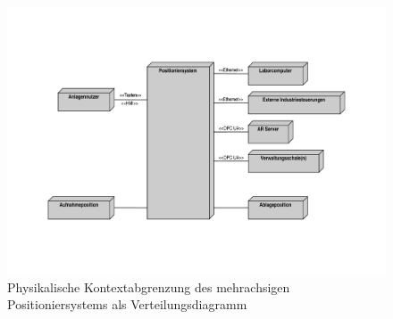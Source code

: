 \documentclass[../../../Bachelorarbeit.tex]{subfiles}
\begin{document}
\begin{figure}[h]
    \centering
    \includegraphics[width=\textwidth]{Images/phys_abgrenzung.pdf}
    \caption[Physikalische Kontextabgrenzung]{Physikalische Kontextabgrenzung des mehrachsigen Positioniersystems als Verteilungsdiagramm}
    \label{fig:my-img2}
\end{figure}
\end{document}
